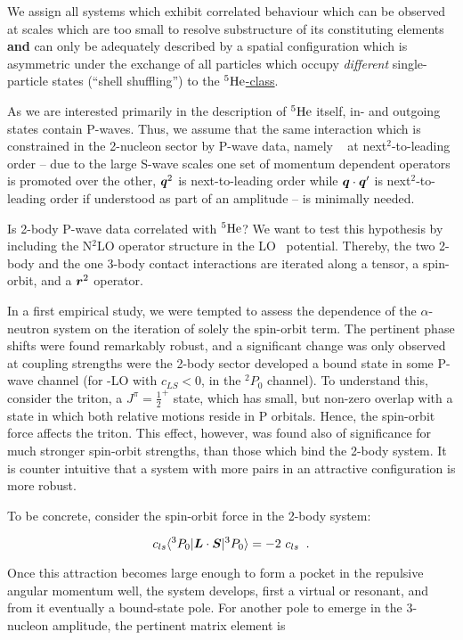 \documentclass[aps,prd,twocolumn
,tightenlines,letterpaper,
nofootinbib]{revtex4-1}
\begin{document}
\begin{definition}
We assign all systems which
exhibit correlated behaviour which can be observed at scales which are too
small to resolve substructure of its constituting elements
{\bf and} can only be adequately described by a spatial 
configuration which is asymmetric under the exchange of all particles which
occupy {\it different} single-particle states (``shell shuffling'')
to the \underline{${{}^5\text{He}}$-class}.
\end{definition}

As we are interested primarily in the description of ${{}^5\text{He}}$ itself, in-
and outgoing states contain P-waves. Thus, we assume that the same interaction
which is constrained in the 2-nucleon sector by P-wave data, namely \eftnopi~
at next$^2$-to-leading order -- due
to the large S-wave scales one set of momentum dependent operators is promoted
over the other, $\boldsymbol{q}^2$ is next-to-leading order while $\boldsymbol{q}\cdot\boldsymbol{q}'$
is next$^2$-to-leading order if understood as part of an amplitude -- is minimally
needed.

Is 2-body P-wave data correlated with ${{}^5\text{He}}$? We want to test this hypothesis
by including the N$^2$LO operator structure in the LO \eftnopi~potential.
Thereby, the two 2-body and the one 3-body contact interactions are iterated
along a tensor, a spin-orbit, and a $\boldsymbol{r}^2$ operator.

In a first empirical study, we were tempted to assess the dependence of the
$\alpha$-neutron system on the iteration of solely the spin-orbit term.
The pertinent phase shifts were found remarkably robust, and a significant change
was only observed at coupling strengths were the 2-body sector developed a
bound state in some P-wave channel (for \eftnopi-LO with $c_{LS}<0$, in the
${}^2P_0$ channel).
To understand this, consider the triton, a $J^\pi=\frac{1}{2}^+$ state, which
has small, but non-zero overlap with a state in which both relative motions
reside in P orbitals. Hence, the spin-orbit force affects the triton.
This effect, however, was found also of significance for much stronger
spin-orbit strengths, than those which bind the 2-body system. It is
counter intuitive that a system with more pairs in an attractive configuration
is more robust.

To be concrete, consider the spin-orbit force in the 2-body system:

$$c_{ls}\langle{}^3P_0\vert\boldsymbol{L}\cdot\boldsymbol{S}\vert{}^3P_0\rangle=-2~c_{ls}\;\;.$$

Once this attraction becomes large enough to form a pocket in the repulsive
angular momentum well, the system develops, first a virtual or resonant, and
from it eventually a bound-state pole.
For another pole to emerge in the 3-nucleon amplitude, the pertinent matrix
element is
\end{document}
